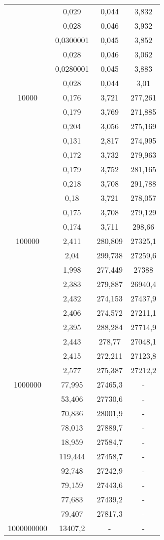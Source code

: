 \documentclass[10pt, a4paper]{article}
\begin{document}
\begin{flushleft}
\begin{table}[h]
\begin{tabular}{|c|c|c|c|}
 & 0,029 & 0,044 & 3,832 \\
 & 0,028 & 0,046 & 3,932 \\
 & 0,0300001 & 0,045 & 3,852 \\
 & 0,028 & 0,046 & 3,062 \\
 & 0,0280001 & 0,045 & 3,883 \\
 & 0,028 & 0,044 & 3,01 \\ \hline
10000 & 0,176 & 3,721 & 277,261 \\
 & 0,179 & 3,769 & 271,885 \\
 & 0,204 & 3,056 & 275,169 \\
 & 0,131 & 2,817 & 274,995 \\
 & 0,172 & 3,732 & 279,963 \\
 & 0,179 & 3,752 & 281,165 \\
 & 0,218 & 3,708 & 291,788 \\
 & 0,18 & 3,721 & 278,057 \\
 & 0,175 & 3,708 & 279,129 \\
 & 0,174 & 3,711 & 298,66 \\ \hline
100000 & 2,411 & 280,809 & 27325,1 \\
 & 2,04 & 299,738 & 27259,6 \\
 & 1,998 & 277,449 & 27388 \\
 & 2,383 & 279,887 & 26940,4 \\
 & 2,432 & 274,153 & 27437,9 \\
 & 2,406 & 274,572 & 27211,1 \\
 & 2,395 & 288,284 & 27714,9 \\
 & 2,443 & 278,77 & 27048,1 \\
 & 2,415 & 272,211 & 27123,8 \\
 & 2,577 & 275,387 & 27212,2 \\ \hline
1000000 & 77,995 & 27465,3 & - \\
 & 53,406 & 27730,6 & - \\
 & 70,836 & 28001,9 & - \\
 & 78,013 & 27889,7 & - \\
 & 18,959 & 27584,7 & - \\
 & 119,444 & 27458,7 & - \\
 & 92,748 & 27242,9 & - \\
 & 79,159 & 27443,6 & - \\
 & 77,683 & 27439,2 & - \\
 & 79,407 & 27817,3 & - \\ \hline
1000000000 & 13407,2 & - & - \\

\end{tabular}
\end{table}
\end{flushleft}
\end{document}
